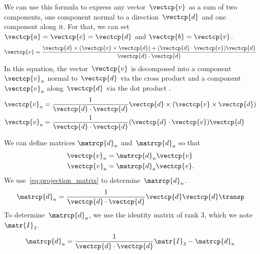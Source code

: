 \begin{refsection}
We can use this formula to express any vector~$\vectcp{v}$ as a sum of two components,
one component normal to a direction~$\vectcp{d}$
and
one component along it.
For that, we can set $\vectcp{a} = \vectcp{c} = \vectcp{d}$ and $\vectcp{b}=\vectcp{v}$.
\begin{equation}
    \vectcp{v} =
    \frac{
        \vectcp{d} \times (\vectcp{v} \times \vectcp{d}) +
        (\vectcp{d} \cdot \vectcp{v}) \vectcp{d}
    }{
        \vectcp{d} \cdot \vectcp{d}
    }
    \label{eq:vector_triple_product_decomposition}
\end{equation}
In this equation, the vector~$\vectcp{v}$ is decomposed into a component
$\vectcp{v}_n$ normal to~$\vectcp{d}$ via the cross product
and a component
$\vectcp{v}_a$ along~$\vectcp{d}$ via the dot product%
.
\begin{subequations}
    \begin{align}
        \vectcp{v}_n
        &=
        \frac{1}{\vectcp{d} \cdot \vectcp{d}}
        \vectcp{d} \times (\vectcp{v} \times \vectcp{d})
        \\
        \vectcp{v}_a
        &=
        \frac{1}{\vectcp{d} \cdot \vectcp{d}}
        (\vectcp{d} \cdot \vectcp{v}) \vectcp{d}
    \end{align}
\end{subequations}

We can define matrices $\matrcp{d}_n$ and~$\matrcp{d}_a$ so that
\begin{subequations}
    \begin{align}
        \vectcp{v}_n &= \matrcp{d}_n \vectcp{v} \\
        \vectcp{v}_a &= \matrcp{d}_a \vectcp{v}
        \text{.}
    \end{align}
\end{subequations}
We use~\cref{eq:projection_matrix} to determine~$\matrcp{d}_n$.
\begin{equation}
    \matrcp{d}_n = \frac{1}{\vectcp{d} \cdot \vectcp{d}} \vectcp{d} \vectcp{d}\transp
    \label{eq:matrix_decomposition_normal}
\end{equation}
To determine~$\matrcp{d}_a$, we use the identity matrix of rank 3, which we note~$\matr{I}_3$.
\begin{equation}
    \matrcp{d}_a = \frac{1}{\vectcp{d} \cdot \vectcp{d}} \matr{I}_3 - \matrcp{d}_n
    \label{eq:matrix_decomposition_along}
\end{equation}



\end{refsection}

